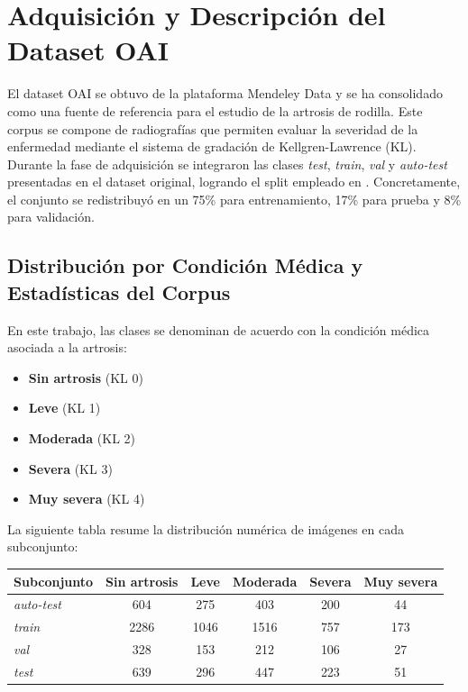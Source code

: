 \documentclass[11pt,spanish,listoffigures,listoftables]{tfgetsinf}
\begin{document}
\section{Adquisición y Descripción del Dataset OAI}
El dataset OAI se obtuvo de la plataforma Mendeley Data y se ha consolidado como una fuente de referencia para el estudio de la artrosis de rodilla. Este corpus se compone de radiografías que permiten evaluar la severidad de la enfermedad mediante el sistema de gradación de Kellgren-Lawrence (KL). Durante la fase de adquisición se integraron las clases \textit{test}, \textit{train}, \textit{val} y \textit{auto-test} presentadas en el dataset original, logrando el split empleado en \cite{efficientnet_paper}. Concretamente, el conjunto se redistribuyó en un 75\% para entrenamiento, 17\% para prueba y 8\% para validación.

\subsection{Distribución por Condición Médica y Estadísticas del Corpus}
En este trabajo, las clases se denominan de acuerdo con la condición médica asociada a la artrosis:
\begin{itemize}
    \item \textbf{Sin artrosis} (KL 0)
    \item \textbf{Leve} (KL 1)
    \item \textbf{Moderada} (KL 2)
    \item \textbf{Severa} (KL 3)
    \item \textbf{Muy severa} (KL 4)
\end{itemize}

La siguiente tabla resume la distribución numérica de imágenes en cada subconjunto:
\begin{center}
\begin{tabular}{lccccc}
\toprule
\textbf{Subconjunto} & \textbf{Sin artrosis} & \textbf{Leve} & \textbf{Moderada} & \textbf{Severa} & \textbf{Muy severa} \\
\midrule
\textit{auto-test} & 604 & 275 & 403 & 200 & 44 \\
\textit{train}     & 2286 & 1046 & 1516 & 757 & 173 \\
\textit{val}       & 328 & 153 & 212 & 106 & 27 \\
\textit{test}      & 639 & 296 & 447 & 223 & 51 \\
\bottomrule
\end{tabular}
\end{center}
\end{document}
